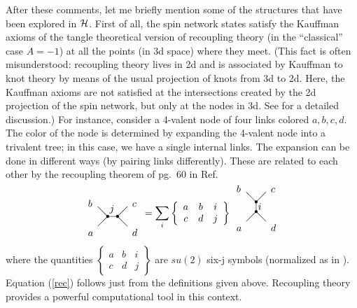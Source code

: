 After these comments, let me briefly mention some of the 
structures that have been explored in $\cal H$. 
First of all, the spin network states satisfy the Kauffman axioms 
of the tangle theoretical version of recoupling theory 
\cite{Kauffman94} (in the ``classical'' case $A=-1$) at all the 
points (in 3d space) where they meet.  (This fact is 
often misunderstood: recoupling theory lives in 2d and is 
associated by Kauffman to knot theory by means of the usual 
projection of knots from 3d to 2d.  Here, the Kauffman axioms 
are not satisfied at the intersections created by the 2d 
projection of the spin network, but only at the nodes 
in 3d.  See \cite{DePietriRovelli} for a detailed discussion.)  
For instance, consider a 4-valent node of four links 
colored $a, b, c, d$.  The color of the node is determined by 
expanding the 4-valent node into a trivalent tree; in 
this case, we have a single internal links.  The expansion can be 
done in different ways (by pairing links differently).  These are 
related to each other by the recoupling theorem of pg.\ 60 in 
Ref.\ \cite{Kauffman94}
\begin{equation}
\begin{array}{c}\setlength{\unitlength}{1 pt}
\begin{picture}(50,50)
          \put( 0,0){$a$}\put( 0,30){$b$}
          \put(45,0){$d$}\put(45,30){$c$}
          \put(10,10){\line(1,1){10}}\put(10,30){\line(1,-1){10}}
          \put(30,20){\line(1,1){10}}\put(30,20){\line(1,-1){10}}
           \put(20,20){\line(1,0){10}}\put(22,25){$j$}
          \put(20,20){\circle*{3}}\put(30,20){\circle*{3}}
\end{picture}\end{array}
    = \sum_i  \left\{\begin{array}{ccc}
                      a  & b & i \\
                      c  & d & j
              \end{array}\right\}
\begin{array}{c}\setlength{\unitlength}{1 pt}
\begin{picture}(40,40)
      \put( 0,0){$a$}\put( 0,40){$b$}
      \put(35,0){$d$}\put(35,40){$c$}
     \put(10,10){\line(1,1){10}}\put(10,40){\line(1,-1){10}}
      \put(20,30){\line(1,1){10}}\put(20,20){\line(1,-1){10}}
      \put(20,20){\line(0,1){10}}\put(22,22){$i$}
      \put(20,20){\circle*{3}}\put(20,30){\circle*{3}}
\end{picture}\end{array}
\label{rec}
\end{equation}
where the quantities 
$\left\{\begin{array}{ccc}
a & b & i \\ c & d & j  \end{array}\right\}$ 
are $su(2)$
six-j symbols (normalized as in \cite{Kauffman94}). Equation 
(\ref{rec}) follows just from the definitions given above. Recoupling 
theory provides a powerful computational tool in this context. 

